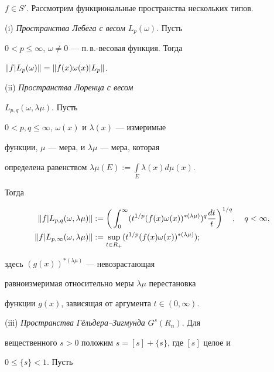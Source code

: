 $f\in S'$. Рассмотрим функциональные пространства нескольких типов.


 


(i) {\it Пространства Лебега с весом} $L_p(\omega)$. Пусть


$0<p\le \infty$, $\omega \ne 0$ --- п.\,в.-весовая функция. Тогда


$\|{f}|{L_p(\omega)}\| =\|{f(x) \omega (x)}|{L_p}\|$.


 


(ii) {\it Пространства Лоренца с весом}


$L_{p,q}(\omega, \lambda \mu)$. Пусть


$0<p,q\le\infty$, $\omega (x)$ и $\lambda (x)$ --- измеримые


функции, $\mu$ --- мера, и $\lambda \mu$ --- мера, которая


определена равенством $\lambda\mu (E):=\int\limits_E


\lambda (x)d\mu (x)$.


Тогда


\begin{align*}


\nor{f}{L_{p,q}(\omega,\lambda\mu)}&:=\bigg(


\int_0^\infty(t^{1/p}(f(x) \omega (x))^{*(\lambda


\mu)})^q\frac{dt}{t}\bigg)^{1/q},\quad q<\infty, \\


%


\nor{f}{L_{p,\infty}(\omega,\lambda\mu)}&:=


\sup\limits_{t\in R_+}(t^{1/p}(f(x) \omega


(x))^{*(\lambda\mu)});


\end{align*}


здесь $(g(x))^{*(\lambda\mu)}$ --- невозрастающая


равноизмеримая относительно меры $\lambda\mu $ перестановка


функции $g(x)$, зависящая от аргумента $t\in (0,\infty)$.


 


(iii) {\it Пространства Г\"ельдера--Зигмунда} $G^s(R_n)$. Для


вещественного $s>0$ положим $s=[s]+\{ s\}$, где $[s]$ целое и


$0\le \{ s\} <1$. Пусть


$$


